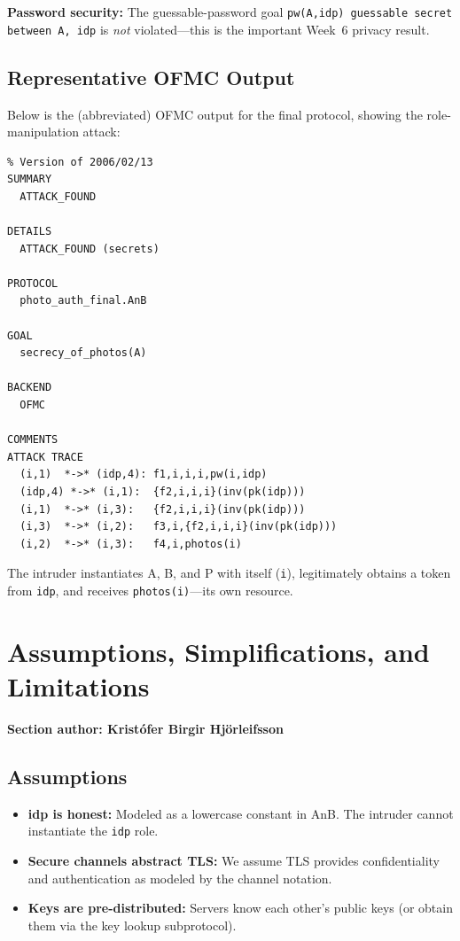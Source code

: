 \documentclass[11pt,a4paper]{article}
\newcommand{\sectionauthor}[1]{\noindent\textbf{Section author: #1}\par\medskip}
\begin{document}
\textbf{Password security:} The guessable-password goal \texttt{pw(A,idp) guessable secret
between A, idp} is \emph{not} violated---this is the important Week~6 privacy result.

\subsection{Representative OFMC Output}
Below is the (abbreviated) OFMC output for the final protocol, showing the role-manipulation
attack:

\begin{lstlisting}[style=terminal,caption={OFMC attack trace for final protocol}]
% OFMC
% Version of 2006/02/13
SUMMARY
  ATTACK_FOUND

DETAILS
  ATTACK_FOUND (secrets)

PROTOCOL
  photo_auth_final.AnB

GOAL
  secrecy_of_photos(A)

BACKEND
  OFMC

COMMENTS
ATTACK TRACE
  (i,1)  *->* (idp,4): f1,i,i,i,pw(i,idp)
  (idp,4) *->* (i,1):  {f2,i,i,i}(inv(pk(idp)))
  (i,1)  *->* (i,3):   {f2,i,i,i}(inv(pk(idp)))
  (i,3)  *->* (i,2):   f3,i,{f2,i,i,i}(inv(pk(idp)))
  (i,2)  *->* (i,3):   f4,i,photos(i)
\end{lstlisting}

\noindent The intruder instantiates A, B, and P with itself (\texttt{i}), legitimately obtains a
token from \texttt{idp}, and receives \texttt{photos(i)}---its own resource.

\section{Assumptions, Simplifications, and Limitations}
\sectionauthor{Kristófer Birgir Hjörleifsson}

\subsection{Assumptions}
\begin{itemize}[leftmargin=*]
  \item \textbf{idp is honest:} Modeled as a lowercase constant in AnB. The intruder cannot
        instantiate the \texttt{idp} role.
  \item \textbf{Secure channels abstract TLS:} We assume TLS provides confidentiality and
        authentication as modeled by the channel notation.
  \item \textbf{Keys are pre-distributed:} Servers know each other's public keys (or obtain
        them via the key lookup subprotocol).
\end{itemize}
\end{document}
